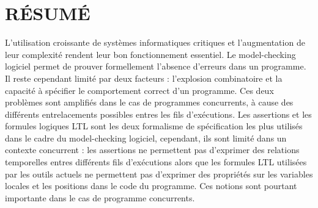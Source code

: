 %
%
\chapter*{RÉSUMÉ}\thispagestyle{headings}



L'utilisation croissante de systèmes informatiques critiques et l'augmentation
de leur complexité rendent leur bon fonctionnement essentiel. Le model-checking
logiciel permet de prouver formellement l'absence d'erreurs dans un programme.
Il reste cependant limité par deux facteurs : l'explosion combinatoire et la
capacité à spécifier le comportement correct d'un programme. Ces deux problèmes
sont amplifiés dans le cas de programmes concurrents, à cause des différents
entrelacements possibles entres les fils d'exécutions. Les assertions et les
formules logiques LTL sont les deux formalisme de spécification les plus
utilisés dans le cadre du model-checking logiciel, cependant, ils sont limité
dans un contexte concurrent : les assertions ne permettent pas d'exprimer des
relations temporelles entres différents fils d'exécutions alors que les formules
LTL utilisées par les outils actuels ne permettent pas d'exprimer des propriétés
sur les variables locales et les positions dans le code du programme. Ces
notions sont pourtant importante dans le cas de programme concurrents.

